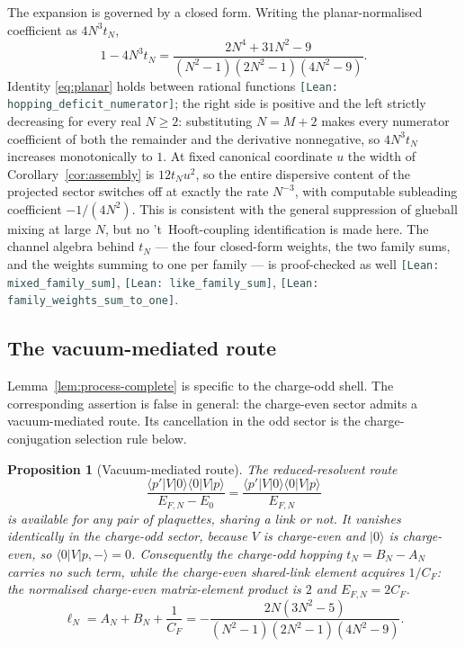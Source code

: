 \documentclass[11pt]{article}
\theoremstyle{plain}
\newtheorem{proposition}[theorem]{Proposition}
\theoremstyle{definition}
\theoremstyle{remark}
\newcommand{\chk}[1]{}
\newcommand{\leanref}[1]{{\footnotesize\textcolor{DarkSlateGray}{\texttt{[Lean: #1]}}}}
\newcommand{\CF}{C_F}
\begin{document}
The expansion is governed by a closed form. Writing the planar-normalised
coefficient as $4N^3t_N$,
\begin{equation}\label{eq:planar}
  1-4N^3t_N=\frac{2N^4+31N^2-9}{(N^2-1)(2N^2-1)(4N^2-9)}.
\end{equation}
Identity \eqref{eq:planar} holds between rational functions
\leanref{hopping\_deficit\_numerator}; the right side is positive and the
left strictly decreasing for every real
$N\ge2$: substituting $N=M+2$ makes every numerator coefficient of both the
remainder and the derivative nonnegative, so $4N^3t_N$ increases monotonically
to $1$. At fixed canonical coordinate $u$ the width of
Corollary~\ref{cor:assembly} is $12t_Nu^2$, so the entire dispersive content
of the projected sector switches off at exactly the rate $N^{-3}$, with
computable subleading coefficient $-1/(4N^2)$. This is consistent with the
general suppression of glueball mixing at large $N$, but no 't~Hooft-coupling
identification is made here. The channel algebra behind $t_N$ --- the four
closed-form weights, the two family sums, and the weights summing to one per
family --- is proof-checked as well \leanref{mixed\_family\_sum},
\leanref{like\_family\_sum}, \leanref{family\_weights\_sum\_to\_one}.
\chk{deficit identity 1/4 - N\^{}3 t\_N}
\chk{N\^{}3 t\_N increases monotonically to 1/4}

\subsection{The vacuum-mediated route}

Lemma~\ref{lem:process-complete} is specific to the charge-odd shell. The
corresponding assertion is false in general: the charge-even sector admits a
vacuum-mediated route. Its cancellation in the odd sector is the
charge-conjugation selection rule below.

\begin{proposition}[Vacuum-mediated route]\label{prop:vacuum}
The reduced-resolvent route
\[
 \frac{\langle p'|V|0\rangle\langle 0|V|p\rangle}{E_{F,N}-E_0}
 =\frac{\langle p'|V|0\rangle\langle 0|V|p\rangle}{E_{F,N}}
\]
is available for any
pair of plaquettes, sharing a link or not. It vanishes identically in the
charge-odd sector, because $V$ is charge-even and $|0\rangle$ is charge-even,
so $\langle0|V|p,-\rangle=0$. Consequently the charge-odd hopping
$t_N=B_N-A_N$ carries no such term, while the charge-even shared-link element
acquires $1/\CF$: the normalised charge-even matrix-element product is $2$
and $E_{F,N}=2\CF$.
\[
  \ell_N=A_N+B_N+\frac1{\CF}
  =-\frac{2N(3N^2-5)}{(N^2-1)(2N^2-1)(4N^2-9)} .
\]
\end{proposition}
\chk{ell\_N = A\_N + B\_N + 1/C\_F, the vacuum-mediated route at every rank}
\end{document}
